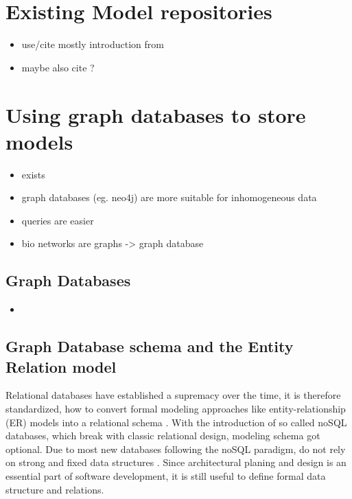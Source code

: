 \section{Existing Model repositories}
\todo{}
\begin{itemize}
	\item use/cite mostly introduction from \cite{Waltemath2013}
	\item maybe also cite \cite{Lysenko2016}?
\end{itemize}

\section{Using graph databases to store \sysbio models}
\label{sec:graph-db}
\begin{itemize}
	\item \masymos exists
	\item graph databases (eg. neo4j) are more suitable for inhomogeneous data
	\item queries are easier
	\item bio networks are graphs -> graph database \cite{Lysenko2016}
\end{itemize}

\subsection{Graph Databases}
\begin{itemize}
	\item {}
\end{itemize}

\subsection{Graph Database schema and the Entity Relation model}
\label{sec:graph-db:er}
Relational databases have established a supremacy over the time, it is therefore standardized, how to convert formal modeling approaches like entity-relationship (ER) models into a relational schema \cite{Saake2010,Teorey1986}. With the introduction of so called noSQL databases, which break with classic relational design, modeling schema got optional. Due to most new databases following the noSQL paradigm, do not rely on strong and fixed data structures .
Since architectural planing and design is an essential part of software development, it is still useful to define formal data structure and relations.

